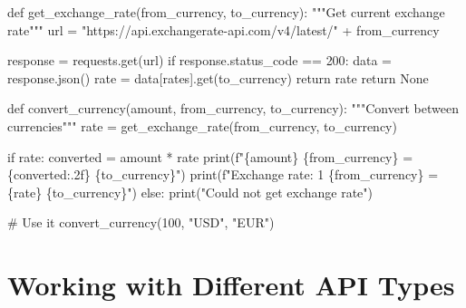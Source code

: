 \documentclass[
  letterpaper,
  DIV=11,
  numbers=noendperiod,
  oneside]{scrreprt}
\newenvironment{Shaded}{}{}
\newcommand{\BuiltInTok}[1]{\textcolor[rgb]{0.84,0.23,0.29}{#1}}
\newcommand{\CommentTok}[1]{\textcolor[rgb]{0.42,0.45,0.49}{#1}}
\newcommand{\ControlFlowTok}[1]{\textcolor[rgb]{0.84,0.23,0.29}{#1}}
\newcommand{\DecValTok}[1]{\textcolor[rgb]{0.00,0.36,0.77}{#1}}
\newcommand{\KeywordTok}[1]{\textcolor[rgb]{0.84,0.23,0.29}{#1}}
\newcommand{\NormalTok}[1]{\textcolor[rgb]{0.14,0.16,0.18}{#1}}
\newcommand{\OperatorTok}[1]{\textcolor[rgb]{0.14,0.16,0.18}{#1}}
\newcommand{\SpecialCharTok}[1]{\textcolor[rgb]{0.00,0.36,0.77}{#1}}
\newcommand{\SpecialStringTok}[1]{\textcolor[rgb]{0.01,0.18,0.38}{#1}}
\newcommand{\StringTok}[1]{\textcolor[rgb]{0.01,0.18,0.38}{#1}}
\newcommand{\VariableTok}[1]{\textcolor[rgb]{0.89,0.38,0.04}{#1}}
\begin{document}
\begin{Shaded}
\begin{Highlighting}[]
\KeywordTok{def}\NormalTok{ get\_exchange\_rate(from\_currency, to\_currency):}
    \CommentTok{"""Get current exchange rate"""}
\NormalTok{    url }\OperatorTok{=} \StringTok{"https://api.exchangerate{-}api.com/v4/latest/"} \OperatorTok{+}\NormalTok{ from\_currency}
    
\NormalTok{    response }\OperatorTok{=}\NormalTok{ requests.get(url)}
    \ControlFlowTok{if}\NormalTok{ response.status\_code }\OperatorTok{==} \DecValTok{200}\NormalTok{:}
\NormalTok{        data }\OperatorTok{=}\NormalTok{ response.json()}
\NormalTok{        rate }\OperatorTok{=}\NormalTok{ data[}\StringTok{\textquotesingle{}rates\textquotesingle{}}\NormalTok{].get(to\_currency)}
        \ControlFlowTok{return}\NormalTok{ rate}
    \ControlFlowTok{return} \VariableTok{None}

\KeywordTok{def}\NormalTok{ convert\_currency(amount, from\_currency, to\_currency):}
    \CommentTok{"""Convert between currencies"""}
\NormalTok{    rate }\OperatorTok{=}\NormalTok{ get\_exchange\_rate(from\_currency, to\_currency)}
    
    \ControlFlowTok{if}\NormalTok{ rate:}
\NormalTok{        converted }\OperatorTok{=}\NormalTok{ amount }\OperatorTok{*}\NormalTok{ rate}
        \BuiltInTok{print}\NormalTok{(}\SpecialStringTok{f"}\SpecialCharTok{\{}\NormalTok{amount}\SpecialCharTok{\}}\SpecialStringTok{ }\SpecialCharTok{\{}\NormalTok{from\_currency}\SpecialCharTok{\}}\SpecialStringTok{ = }\SpecialCharTok{\{}\NormalTok{converted}\SpecialCharTok{:.2f\}}\SpecialStringTok{ }\SpecialCharTok{\{}\NormalTok{to\_currency}\SpecialCharTok{\}}\SpecialStringTok{"}\NormalTok{)}
        \BuiltInTok{print}\NormalTok{(}\SpecialStringTok{f"Exchange rate: 1 }\SpecialCharTok{\{}\NormalTok{from\_currency}\SpecialCharTok{\}}\SpecialStringTok{ = }\SpecialCharTok{\{}\NormalTok{rate}\SpecialCharTok{\}}\SpecialStringTok{ }\SpecialCharTok{\{}\NormalTok{to\_currency}\SpecialCharTok{\}}\SpecialStringTok{"}\NormalTok{)}
    \ControlFlowTok{else}\NormalTok{:}
        \BuiltInTok{print}\NormalTok{(}\StringTok{"Could not get exchange rate"}\NormalTok{)}

\CommentTok{\# Use it}
\NormalTok{convert\_currency(}\DecValTok{100}\NormalTok{, }\StringTok{"USD"}\NormalTok{, }\StringTok{"EUR"}\NormalTok{)}
\end{Highlighting}
\end{Shaded}

\section{Working with Different API
Types}\label{working-with-different-api-types}
\end{document}
